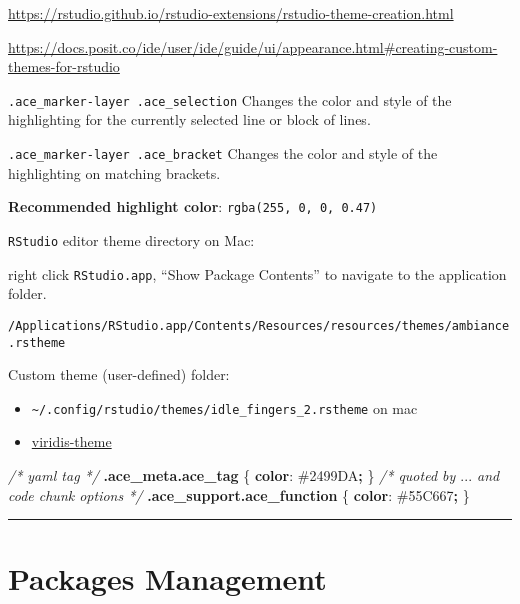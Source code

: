 \documentclass[
]{book}
\newenvironment{Shaded}{\begin{snugshade}}{\end{snugshade}}
\newcommand{\CharTok}[1]{\textcolor[rgb]{0.31,0.60,0.02}{#1}}
\newcommand{\CommentTok}[1]{\textcolor[rgb]{0.56,0.35,0.01}{\textit{#1}}}
\newcommand{\ConstantTok}[1]{\textcolor[rgb]{0.56,0.35,0.01}{#1}}
\newcommand{\FunctionTok}[1]{\textcolor[rgb]{0.13,0.29,0.53}{\textbf{#1}}}
\newcommand{\KeywordTok}[1]{\textcolor[rgb]{0.13,0.29,0.53}{\textbf{#1}}}
\newcommand{\NormalTok}[1]{#1}
\newcommand{\OperatorTok}[1]{\textcolor[rgb]{0.81,0.36,0.00}{\textbf{#1}}}
\providecommand{\tightlist}{%
  \setlength{\itemsep}{0pt}\setlength{\parskip}{0pt}}
\begin{document}
\url{https://rstudio.github.io/rstudio-extensions/rstudio-theme-creation.html}

\url{https://docs.posit.co/ide/user/ide/guide/ui/appearance.html\#creating-custom-themes-for-rstudio}

\texttt{.ace\_marker-layer\ .ace\_selection} Changes the color and style of the highlighting for the currently selected line or block of lines.

\texttt{.ace\_marker-layer\ .ace\_bracket} Changes the color and style of the highlighting on matching brackets.

\textbf{Recommended highlight color}: \texttt{rgba(255,\ 0,\ 0,\ 0.47)}

\texttt{RStudio} editor theme directory on Mac:

right click \texttt{RStudio.app}, ``Show Package Contents'' to navigate to the application folder.

\texttt{/Applications/RStudio.app/Contents/Resources/resources/themes/ambiance.rstheme}

Custom theme (user-defined) folder:

\begin{itemize}
\tightlist
\item
  \texttt{\textasciitilde{}/.config/rstudio/themes/idle\_fingers\_2.rstheme} on mac
\item
  \href{https://github.com/z3tt/viridis-theme/blob/main/viridis.rstheme}{viridis-theme}
\end{itemize}

\begin{Shaded}
\begin{Highlighting}[]
\CommentTok{/* yaml tag */}
\FunctionTok{.ace\_meta.ace\_tag}\NormalTok{ \{}
  \KeywordTok{color}\CharTok{:} \ConstantTok{\#2499DA}\OperatorTok{;}
\NormalTok{\}}
\CommentTok{/* quoted by $...$ and code chunk options */}
\FunctionTok{.ace\_support.ace\_function}\NormalTok{ \{}
  \KeywordTok{color}\CharTok{:} \ConstantTok{\#55C667}\OperatorTok{;}
\NormalTok{\}}
\end{Highlighting}
\end{Shaded}

\begin{center}\rule{0.5\linewidth}{0.5pt}\end{center}

\section{Packages Management}\label{packages-management}
\end{document}
